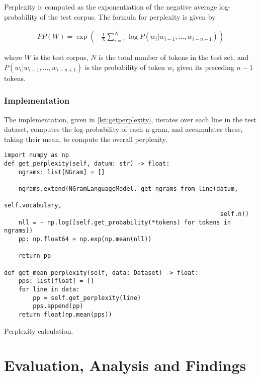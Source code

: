 \documentclass[a4paper]{article}
\begin{document}
Perplexity is computed as the exponentiation of the negative average log-probability of the test corpus. The formula for perplexity is given by

\begin{align*}
  PP(W)= \exp\left(-\frac{1}{N} \sum_{i=1}^{N} \log P(w_i | w_{i-1}, \ldots, w_{i-n+1})\right)
\end{align*}

where \(W\) is the test corpus, \(N\) is the total number of tokens in the test set, and \(P(w_i | w_{i-1}, \ldots, w_{i-n+1})\) is the probability of token \(w_i\) given its preceding \(n-1\) tokens.

\subsubsection{Implementation}
The implementation, given in \ref{lst:getperplexity}, iterates over each line in the test dataset, computes the log-probability of each n-gram, and accumulates these, taking their mean, to compute the overall perplexity.

\begin{listing}[H]
  \begin{verbatim}
import numpy as np
def get_perplexity(self, datum: str) -> float:
    ngrams: list[NGram] = []

    ngrams.extend(NGramLanguageModel._get_ngrams_from_line(datum, 
                                                            self.vocabulary, 
                                                            self.n))
    nll = - np.log([self.get_probability(*tokens) for tokens in ngrams])
    pp: np.float64 = np.exp(np.mean(nll))

    return pp

def get_mean_perplexity(self, data: Dataset) -> float:
    pps: list[float] = []
    for line in data:
        pp = self.get_perplexity(line)
        pps.append(pp)
    return float(np.mean(pps))
\end{verbatim}
  \caption{Perplexity calculation.}
  \label{lst:getperplexity}
\end{listing}

\section{Evaluation, Analysis and Findings}

\end{document}
